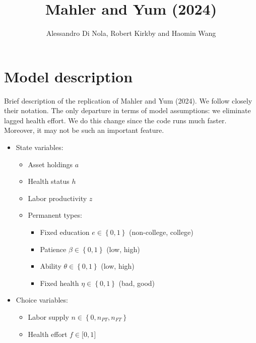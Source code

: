 \documentclass[12pt,a4paper]{article}
\begin{document}
\title{Mahler and Yum (2024)}
\author{Alessandro Di Nola, Robert Kirkby and Haomin Wang}
\date{}
\maketitle

\section{Model description}

Brief description of the replication of Mahler and Yum (2024). We follow
closely their notation. The only departure in terms of model assumptions: we
eliminate lagged health effort. We do this change since the code runs much
faster. Moreover, it may not be such an important feature.

\begin{itemize}
\item State variables:

\begin{itemize}
\item Asset holdings $a$

\item Health status $h$

\item Labor productivity $z$

\item Permanent types:

\begin{itemize}
\item Fixed education $e\in \left\{ 0,1\right\} $ (non-college, college)

\item Patience $\beta \in \left\{ 0,1\right\} $ (low, high)

\item Ability $\theta \in \left\{ 0,1\right\} $ (low, high)

\item Fixed health $\eta \in \left\{ 0,1\right\} $ (bad, good)
\end{itemize}
\end{itemize}

\item Choice variables:

\begin{itemize}
\item Labor supply $n\in \left\{ 0,n_{PT},n_{FT}\right\} $

\item Health effort $f\in \lbrack 0,1]$


\end{itemize}
\end{itemize}
\end{document}
